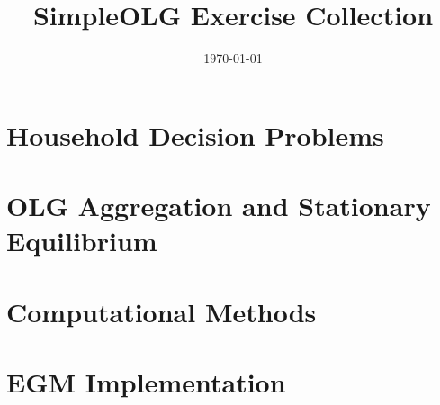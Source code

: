 \documentclass[12pt,addpoints]{exam}
\title{SimpleOLG Exercise Collection}
\author{}
\date{\today}
\begin{document}
\maketitle

\tableofcontents
\clearpage

\begin{questions}

\section{Household Decision Problems}

\clearpage

\clearpage

\clearpage

\clearpage

\clearpage

\section{OLG Aggregation and Stationary Equilibrium}

\clearpage

\clearpage

\clearpage

\clearpage

\section{Computational Methods}

\clearpage

\clearpage

\section{EGM Implementation}

\clearpage

\clearpage


\end{questions}
\end{document}
